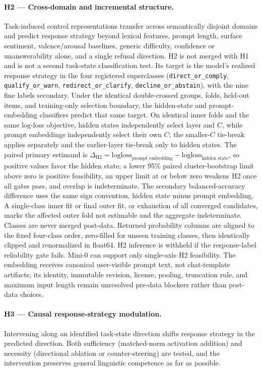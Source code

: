 \documentclass[11pt]{article}
\begin{document}
\paragraph{H2 --- Cross-domain and incremental structure.}
Task-induced control representations transfer across semantically disjoint domains
and predict response strategy beyond lexical features, prompt length, surface
sentiment, valence/arousal baselines, generic difficulty, confidence or
unanswerability alone, and a single refusal direction. H2 is not merged with H1 and
is not a second task-state classification test. Its target is the model's realized
response strategy in the four registered superclasses (\texttt{direct\_or\_comply},
\texttt{qualify\_or\_warn}, \texttt{redirect\_or\_clarify},
\texttt{decline\_or\_abstain}), with the nine fine labels secondary. Under the
identical double-crossed groups, folds, held-out items, and training-only selection
boundary, the hidden-state and prompt-embedding classifiers predict that same
target. On identical inner folds and the same log-loss objective, hidden states
independently select layer and $C$, while prompt embeddings independently select
their own $C$; the smaller-$C$ tie-break applies separately and the earlier-layer
tie-break only to hidden states. The paired primary estimand is
$\Delta_{\mathrm{H2}} = \mathrm{logloss}_{\text{prompt embedding}} -
\mathrm{logloss}_{\text{hidden state}}$, so positive values favor the hidden
state; a lower 95\% paired cluster-bootstrap limit above zero is positive
feasibility, an upper limit at or below zero weakens H2 once all gates pass, and
overlap is indeterminate. The secondary balanced-accuracy difference uses the same
sign convention, hidden state minus prompt embedding. A single-class inner fit or
final outer fit, or exhaustion of all converged candidates, marks the affected
outer fold not estimable and the aggregate indeterminate. Classes are never merged
post-data. Returned probability columns are aligned to the fixed four-class order,
zero-filled for unseen training classes, then identically clipped and renormalized
in float64. H2 inference is withheld if the response-label reliability gate fails.
Mini-0
can support only single-axis H2 feasibility. The embedding receives canonical
user-visible prompt text, not chat-template artifacts; its identity, immutable
revision, license, pooling, truncation rule, and maximum input length remain
unresolved pre-data blockers rather than post-data choices.

\paragraph{H3 --- Causal response-strategy modulation.}
Intervening along an identified task-state direction shifts response strategy in
the predicted direction. Both sufficiency (matched-norm activation addition) and
necessity (directional ablation or counter-steering) are tested, and the
intervention preserves general linguistic competence as far as possible.
\end{document}
